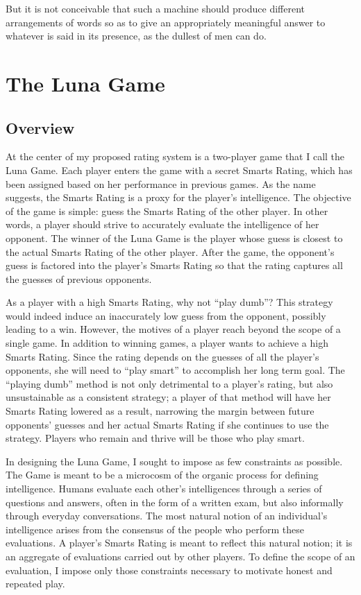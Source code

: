 \begin{savequote}[75mm]
But it is not conceivable that such a machine should produce different arrangements of words so as to give an appropriately meaningful answer to whatever is said in its presence, as the dullest of men can do.
\end{savequote}

\chapter{The Luna Game}

\section{Overview}

At the center of my proposed rating system is a two-player game that I call the Luna Game. Each player enters the game with a secret Smarts Rating, which has been assigned based on her performance in previous games. As the name suggests, the Smarts Rating is a proxy for the player's intelligence. The objective of the game is simple: guess the Smarts Rating of the other player. In other words, a player should strive to accurately evaluate the intelligence of her opponent. The winner of the Luna Game is the player whose guess is closest to the actual Smarts Rating of the other player. After the game, the opponent's guess is factored into the player's Smarts Rating so that the rating captures all the guesses of previous opponents.

As a player with a high Smarts Rating, why not ``play dumb''? This strategy would indeed induce an inaccurately low guess from the opponent, possibly leading to a win. However, the motives of a player reach beyond the scope of a single game. In addition to winning games, a player wants to achieve a high Smarts Rating. Since the rating depends on the guesses of all the player's opponents, she will need to ``play smart'' to accomplish her long term goal. The ``playing dumb'' method is not only detrimental to a player's rating, but also unsustainable as a consistent strategy; a player of that method will have her Smarts Rating lowered as a result, narrowing the margin between future opponents' guesses and her actual Smarts Rating if she continues to use the strategy. Players who remain and thrive will be those who play smart.

In designing the Luna Game, I sought to impose as few constraints as possible. The Game is meant to be a microcosm of the organic process for defining intelligence. Humans evaluate each other's intelligences through a series of questions and answers, often in the form of a written exam, but also informally through everyday conversations. The most natural notion of an individual's intelligence arises from the consensus of the people who perform these evaluations. A player's Smarts Rating is meant to reflect this natural notion; it is an aggregate of evaluations carried out by other players. To define the scope of an evaluation, I impose only those constraints necessary to motivate honest and repeated play.

